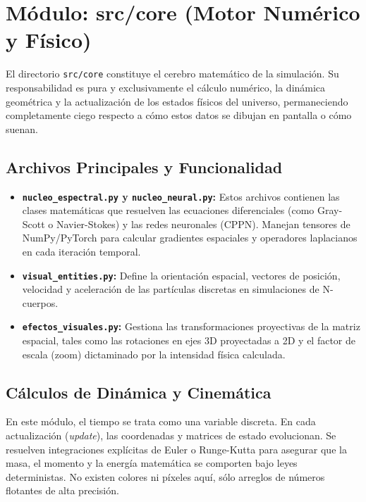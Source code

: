 \documentclass[12pt]{article}
\begin{document}
\section{Módulo: src/core (Motor Numérico y Físico)}

El directorio \texttt{src/core} constituye el cerebro matemático de la simulación. Su responsabilidad es pura y exclusivamente el cálculo numérico, la dinámica geométrica y la actualización de los estados físicos del universo, permaneciendo completamente ciego respecto a cómo estos datos se dibujan en pantalla o cómo suenan.

\subsection{Archivos Principales y Funcionalidad}
\begin{itemize}
    \item \textbf{\texttt{nucleo\_espectral.py} y \textbf{\texttt{nucleo\_neural.py}}:} Estos archivos contienen las clases matemáticas que resuelven las ecuaciones diferenciales (como Gray-Scott o Navier-Stokes) y las redes neuronales (CPPN). Manejan tensores de NumPy/PyTorch para calcular gradientes espaciales y operadores laplacianos en cada iteración temporal.
    \item \textbf{\texttt{visual\_entities.py}:} Define la orientación espacial, vectores de posición, velocidad y aceleración de las partículas discretas en simulaciones de N-cuerpos. 
    \item \textbf{\texttt{efectos\_visuales.py}:} Gestiona las transformaciones proyectivas de la matriz espacial, tales como las rotaciones en ejes 3D proyectadas a 2D y el factor de escala (zoom) dictaminado por la intensidad física calculada.
\end{itemize}

\subsection{Cálculos de Dinámica y Cinemática}
En este módulo, el tiempo se trata como una variable discreta. En cada actualización (\textit{update}), las coordenadas y matrices de estado evolucionan. Se resuelven integraciones explícitas de Euler o Runge-Kutta para asegurar que la masa, el momento y la energía matemática se comporten bajo leyes deterministas. No existen colores ni píxeles aquí, sólo arreglos de números flotantes de alta precisión.
\end{document}
